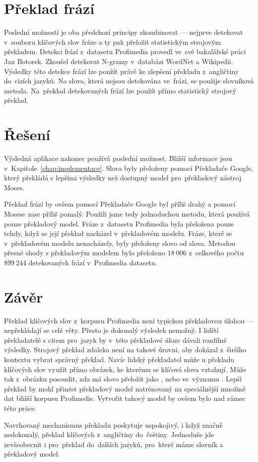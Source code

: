 \section{Překlad frází}

Poslední možností je oba předchozí principy zkombinovat --- nejprve detekovat v~souboru klíčových slov fráze a ty pak přeložit statistickým strojovým překladem. Detekci frází z~datasetu Profimedia provedl ve~své bakalářské práci\cite{botorek} Jan Botorek. Zkoušel detekovat N-gramy v~databázi WordNet\cite{wordnet} a Wikipedii. Výsledky této detekce frází lze použít právě ke zlepšení překladu z~angličtiny do~cizích jazyků. Na slova, která nejsou detekována ve~frázi, se použije slovníková metoda. Na~překlad detekovaných frází lze použít přímo statistický strojový překlad.


\section{Řešení}

Výsledná aplikace nakonec používá poslední možnost. Bližší informace jsou v~Kapitole~\ref{chap:implementace}. Slova byly přeloženy pomocí Překladače Google, který překládá s lepšími výsledky než dostupný model pro~překladový nástroj Moses.

Překlad frází by ovšem pomocí Překladače Google byl příliš drahý a pomocí Mosese zase příliš pomalý. Použili jsme tedy jednoduchou metodu, která používá pouze překladový model. Fráze z~datasetu Profimedia byla přeložena pouze tehdy, když se její překlad nacházel v~překladovém modelu. Fráze, které se v~překladovém modelu nenacházely, byly přeloženy slovo od slova. Metodou přesné shody s překladovým modelem bylo přeloženo $18\ 006$ z~celkového počtu $899\ 244$ detekovaných frází v~Profimedia datasetu.

\section{Závěr}

Překlad klíčových slov z~korpusu Profimedia není typickou překladovou úlohou --- nepřekládají se celé věty. Přesto je dokonalý výsledek nemožný. I lidští překladatelé s citem pro~jazyk by v~této překladové úloze dávali rozdílné výsledky. Strojový překlad zdaleka není na takové úrovni, aby dokázal z~širšího kontextu vybrat správný překlad. Navíc lidský překladatel může u překladu klíčových slov využít přímo obrázek, ke kterému se klíčová slova vztahují. Může tak z~obrázku posoudit, zda má slovo  přeložit jako , nebo ve~významu . Lepší překlad by mohl přinést překladový model natrénovaný na speciálnější množině dat bližší korpusu Profimedie. Vytvořit takový model by ovšem bylo nad rámec této práce.

Navrhovaný mechanismus překladu poskytuje uspokojivý, i když značně nedokonalý, překlad klíčových z~angličtiny do~češtiny. Jednoduše jde zevšeobecnit i pro~překlad do~dalších jazyků, pro~které máme slovník a překladový model.

